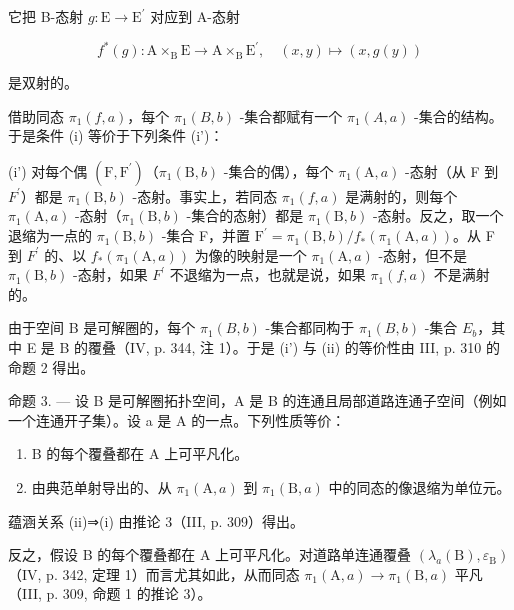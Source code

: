它把 B-态射 \(g\colon \mathrm{E}\to \mathrm{E}^{\prime}\) 对应到 A-态射

\[
f ^ {*} (g) \colon \mathrm{A} \times_ {\mathrm{B}} \mathrm{E} \rightarrow \mathrm{A} \times_ {\mathrm{B}} \mathrm{E} ^ {\prime}, \quad (x, y) \mapsto (x, g (y))
\]

是双射的。

借助同态 \(\pi_1(f, a)\)，每个 \(\pi_1(B, b)\) -集合都赋有一个 \(\pi_1(A, a)\) -集合的结构。于是条件 (i) 等价于下列条件 (i')：

(i') 对每个偶 \((\mathrm{F},\mathrm{F}^{\prime})\)（\(\pi_{1}(\mathrm{B},b)\) -集合的偶），每个 \(\pi_{1}(\mathrm{A},a)\) -态射（从 F 到 \(F^{\prime}\)）都是 \(\pi_{1}(\mathrm{B},b)\) -态射。事实上，若同态 \(\pi_{1}(f,a)\) 是满射的，则每个 \(\pi_{1}(\mathrm{A},a)\) -态射（\(\pi_{1}(\mathrm{B},b)\) -集合的态射）都是 \(\pi_{1}(\mathrm{B},b)\) -态射。反之，取一个退缩为一点的 \(\pi_{1}(\mathrm{B},b)\) -集合 F，并置 \(\mathrm{F}^{\prime}=\pi_{1}(\mathrm{B},b)/f_{*}(\pi_{1}(\mathrm{A},a))\)。从 F 到 \(F^{\prime}\) 的、以 \(f_{*}(\pi_{1}(\mathrm{A},a))\) 为像的映射是一个 \(\pi_{1}(\mathrm{A},a)\) -态射，但不是 \(\pi_{1}(\mathrm{B},b)\) -态射，如果 \(F^{\prime}\) 不退缩为一点，也就是说，如果 \(\pi_{1}(f,a)\) 不是满射的。

由于空间 B 是可解圈的，每个 \(\pi_{1}(B,b)\) -集合都同构于 \(\pi_{1}(B,b)\) -集合 \(E_{b}\)，其中 E 是 B 的覆叠（IV, p. 344, 注 1）。于是 (i') 与 (ii) 的等价性由 III, p. 310 的命题 2 得出。

命题 3. --- 设 B 是可解圈拓扑空间，A 是 B 的连通且局部道路连通子空间（例如一个连通开子集）。设 a 是 A 的一点。下列性质等价：

\begin{enumerate}
\def\labelenumi{(\roman{enumi})}
\item
  B 的每个覆叠都在 A 上可平凡化。
\item
  由典范单射导出的、从 \(\pi_{1}(\mathrm{A},a)\) 到 \(\pi_{1}(\mathrm{B},a)\) 中的同态的像退缩为单位元。
\end{enumerate}

蕴涵关系 (ii)⇒(i) 由推论 3（III, p. 309）得出。

反之，假设 B 的每个覆叠都在 A 上可平凡化。对道路单连通覆叠 \((\lambda_{a}(\mathrm{B}),\varepsilon_{\mathrm{B}})\)（IV, p. 342, 定理 1）而言尤其如此，从而同态 \(\pi_{1}(\mathrm{A},a)\to\pi_{1}(\mathrm{B},a)\) 平凡（III, p. 309, 命题 1 的推论 3）。

